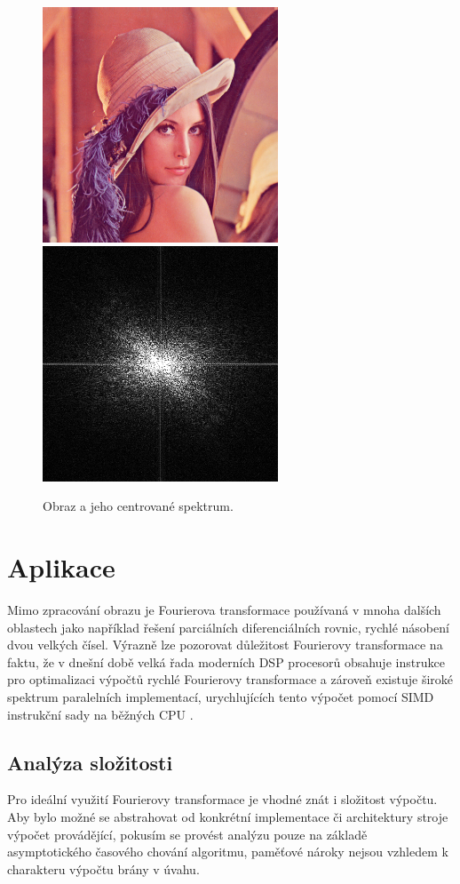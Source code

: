 \documentclass[11pt,a4paper]{article}
\begin{document}
\begin{figure}[H]
\centering
\includegraphics[width=7cm]{images/lena.png}
\includegraphics[width=7cm]{images/lena_spec.png}
\caption{Obraz a jeho centrované spektrum.}
\label{spec}
\end{figure}


\section{Aplikace}
Mimo zpracování obrazu je Fourierova transformace používaná v mnoha dalších oblastech jako například
řešení parciálních diferenciálních rovnic, rychlé násobení dvou velkých čísel. Výrazně lze pozorovat
důležitost Fourierovy transformace na faktu, že v dnešní době velká řada moderních DSP procesorů obsahuje
instrukce pro optimalizaci výpočtů rychlé Fourierovy transformace a zároveň existuje široké spektrum
paralelních implementací, urychlujících tento výpočet pomocí SIMD instrukční sady na běžných CPU \cite{xilinx}.

\subsection{Analýza složitosti}
Pro ideální využití Fourierovy transformace je vhodné znát i složitost výpočtu. Aby bylo  možné se
abstrahovat od konkrétní implementace či architektury stroje výpočet provádějící, 
pokusím se provést analýzu pouze na základě asymptotického časového chování algoritmu, paměťové
nároky nejsou vzhledem k charakteru výpočtu brány v úvahu.
\end{document}
